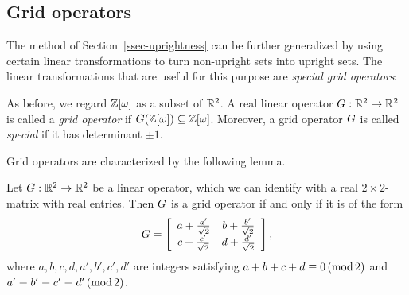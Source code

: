 \documentclass{article}
\begin{document}
\subsection{Grid operators}\label{ssec-gridops}

The method of Section~\ref{ssec-uprightness} can be further
generalized by using certain linear transformations to turn
non-upright sets into upright sets. The linear transformations that
are useful for this purpose are {\em special grid operators}:

\begin{definition}
  As before, we regard $\mathbb{Z}[\omega]$ as a subset of ${\mathbb{R}}^2$. A real linear
  operator $G:{\mathbb{R}}^2 \to {\mathbb{R}}^2$ is called a {\em grid operator} if
  $G(\mathbb{Z}[\omega]) \subseteq \mathbb{Z}[\omega]$. Moreover, a grid operator $G$ is
  called {\em special} if it has determinant $\pm 1$.
\end{definition}

Grid operators are characterized by the following lemma.

\begin{lemma}\label{lem-gridoperators}
  Let $G:{\mathbb{R}}^2\to{\mathbb{R}}^2$ be a linear operator, which we can identify
  with a real $2\times 2$-matrix with real entries. Then $G$ is a
  grid operator if and only if it is of the form
  \begin{equation}\label{eqn-gridoperator}
    G =
    \left[
      \begin{array}{cc}
        a+\frac{a'}{\sqrt{2}} & b+\frac{b'}{\sqrt{2}}\\
        c+\frac{c'}{\sqrt{2}} & d+\frac{d'}{\sqrt{2}}
      \end{array}
    \right],
  \end{equation}
  where $a,b,c,d,a',b',c',d'$ are integers satisfying $a+b+c+d \equiv
  0\,(\mathop{{\rm mod}}2)$ and $a'\equiv b'\equiv c' \equiv d'\,(\mathop{{\rm mod}}2)$.
\end{lemma}
\end{document}
